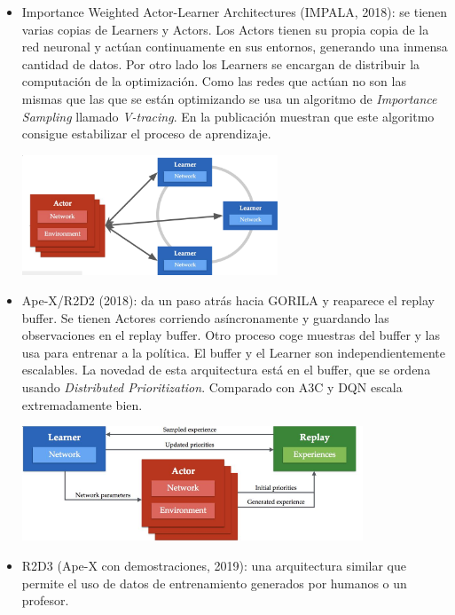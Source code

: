 \begin{itemize}
\begin{center}
\end{center}
    \item Importance Weighted Actor-Learner Architectures (IMPALA, 2018): se tienen varias
        copias de Learners y Actors. Los Actors tienen su propia copia de la red neuronal y
        actúan continuamente en sus entornos, generando una inmensa cantidad de datos. Por otro
        lado los Learners se encargan de distribuir la computación de la optimización. Como las
        redes que actúan no son las mismas que las que se están optimizando se usa un
        algoritmo de \textit{Importance Sampling} llamado \textit{V-tracing}. En la publicación
        muestran que este algoritmo consigue estabilizar el proceso de aprendizaje.
\begin{center}
\includegraphics[width=0.6\textwidth]{figures/2020-07-13-143822_930x438_scrot.png}
\end{center}
    \item Ape-X/R2D2 (2018): da un paso atrás hacia GORILA y reaparece el replay buffer. Se
        tienen Actores corriendo asíncronamente y guardando las observaciones en el replay
        buffer. Otro proceso coge muestras del buffer y las usa para entrenar a la política.
        El buffer y el Learner son independientemente escalables. La novedad de esta
        arquitectura está en el buffer, que se ordena usando \textit{Distributed
        Prioritization}. Comparado con A3C y DQN escala extremadamente bien.
\begin{center}
\includegraphics[width=0.8\textwidth]{figures/2020-07-13-150358_749x252_scrot.png}
\end{center}
    \item R2D3 (Ape-X con demostraciones, 2019): una arquitectura similar que permite el uso de
        datos de entrenamiento generados por humanos o un profesor.

\end{itemize}
